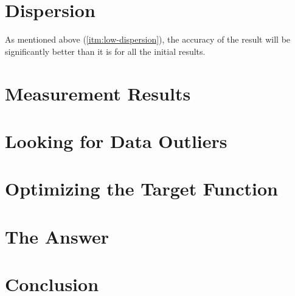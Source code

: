 \documentclass[11pt]{memoir}
\begin{document}
    \section {Dispersion}\label{sec:dispersion}
        \newline
        As mentioned above (\ref{itm:low-dispersion}), the accuracy of the result will be significantly better than it is for all the initial results.

    \section{Measurement Results}\label{sec:measurement-results}

    \section {Looking for Data Outliers}\label{sec:looking-for-data-outliers}

    \section{Optimizing the Target Function}\label{sec:optimizing-the-target-function}


    \section{The Answer}\label{sec:answer}


    \section{Conclusion}\label{sec:conclusion}



\end{document}
